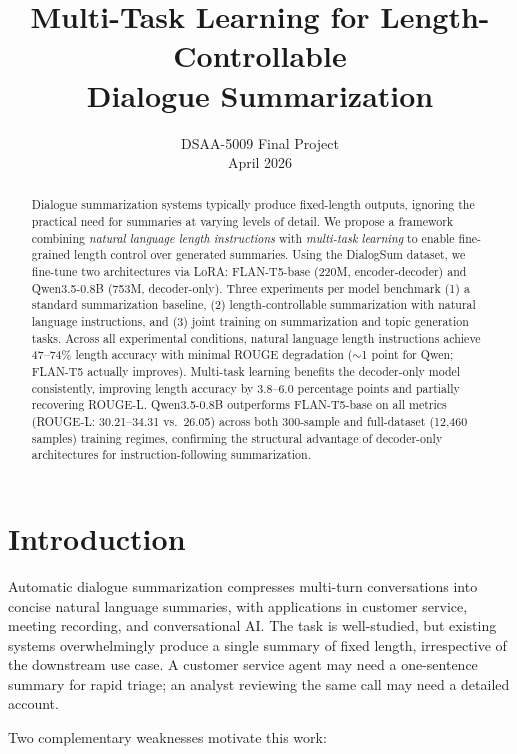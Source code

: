 \documentclass[11pt,a4paper]{article}
\title{\textbf{Multi-Task Learning for Length-Controllable\\Dialogue Summarization}}
\author{
  DSAA-5009 Final Project \\
  April 2026
}
\date{}
\begin{document}
\maketitle

\begin{abstract}
Dialogue summarization systems typically produce fixed-length outputs, ignoring the practical need for summaries at varying levels of detail.
We propose a framework combining \emph{natural language length instructions} with \emph{multi-task learning} to enable fine-grained length control over generated summaries.
Using the DialogSum dataset, we fine-tune two architectures via LoRA: FLAN-T5-base (220M, encoder-decoder) and Qwen3.5-0.8B (753M, decoder-only).
Three experiments per model benchmark (1) a standard summarization baseline, (2) length-controllable summarization with natural language instructions, and (3) joint training on summarization and topic generation tasks.
Across all experimental conditions, natural language length instructions achieve 47--74\% length accuracy with minimal ROUGE degradation (${\sim}$1 point for Qwen; FLAN-T5 actually improves).
Multi-task learning benefits the decoder-only model consistently, improving length accuracy by 3.8--6.0 percentage points and partially recovering ROUGE-L.
Qwen3.5-0.8B outperforms FLAN-T5-base on all metrics (ROUGE-L: 30.21--34.31 vs.\ 26.05) across both 300-sample and full-dataset (12,460 samples) training regimes, confirming the structural advantage of decoder-only architectures for instruction-following summarization.
\end{abstract}

\section{Introduction}

Automatic dialogue summarization compresses multi-turn conversations into concise natural language summaries, with applications in customer service, meeting recording, and conversational AI.
The task is well-studied, but existing systems overwhelmingly produce a single summary of fixed length, irrespective of the downstream use case.
A customer service agent may need a one-sentence summary for rapid triage; an analyst reviewing the same call may need a detailed account.

Two complementary weaknesses motivate this work:
\end{document}

